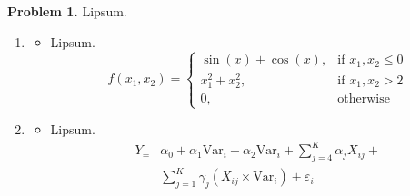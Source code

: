 \noindent \textbf{Problem 1. } Lipsum. 

\begin{enumerate}[label=\textbf{\alph*.}, wide, labelindent=0pt] %

    \item \emph{\lipsum[1]} 
	
	    \begin{itemize} %
	        \item[] Lipsum.
    \[ f(x_1, x_2) = \begin{cases} 
          \sin(x) + \cos(x), & \text{if } x_1, x_2 \leq 0 \\
          x_1^2 + x_2^2, & \text{if } x_1, x_2 > 2 \\
          0, & \text{otherwise}
       \end{cases}
    \]
	    \end{itemize}
	
	\item \emph{\lipsum[1]}
	
	    \begin{itemize} %
	        \item[] Lipsum.	\begin{equation}
	    \begin{split}
	        Y_ = &\alpha_0 + \alpha_1 \text{Var}_i + \alpha_2 \text{Var}_i + \sum\limits_{j = 4}^K \alpha_j X_{ij} + \\ & \sum\limits_{j = 1}^K \gamma_j (X_{ij} \times \text{Var}_i) + \varepsilon_i
	    \end{split}
	\end{equation}
	    \end{itemize}
\end{enumerate}

\newpage

	